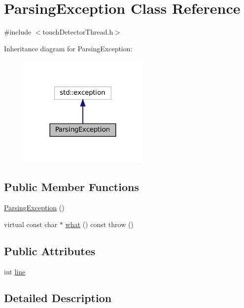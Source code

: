 \hypertarget{classParsingException}{}\section{Parsing\+Exception Class Reference}
\label{classParsingException}


{\ttfamily \#include $<$touch\+Detector\+Thread.\+h$>$}



Inheritance diagram for Parsing\+Exception\+:
\nopagebreak
\begin{figure}[H]
\begin{center}
\leavevmode
\includegraphics[width=180pt]{classParsingException__inherit__graph}
\end{center}
\end{figure}
\subsection*{Public Member Functions}
\begin{DoxyCompactItemize}
\item 
\hyperlink{classParsingException_a58f3455a94daadc74646f40d76ecb07c}{Parsing\+Exception} ()
\item 
virtual const char $\ast$ \hyperlink{classParsingException_a4e8e701c3b59557a8b81bff868ed0d09}{what} () const  throw ()
\end{DoxyCompactItemize}
\subsection*{Public Attributes}
\begin{DoxyCompactItemize}
\item 
int \hyperlink{classParsingException_a1ad6253d81cc001cc9a6c6e318a3e1c2}{line}
\end{DoxyCompactItemize}


\subsection{Detailed Description}


